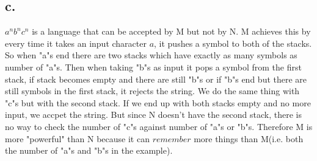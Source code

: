 \documentclass[12pt]{article}
\begin{document}
\subsection*{c.}
$a^nb^nc^n$ is a language that can be accepted by M but not by N. M achieves this by every time it takes an input character $a$, it pushes a symbol to both of the stacks. So when "a"s end there are two stacks which have exactly as many symbols as number of "a"s. Then when taking "b"s as input it pops a symbol from the first stack, if stack becomes empty and there are still "b"s or if "b"s end but there are still symbols in the first stack, it rejects the string. We do the same thing with "c"s but with the second stack. If we end up with both stacks empty and no more input, we accpet the string. But since N doesn't have the second stack, there is no way to check the number of "c"s against number of "a"s or "b"s. Therefore M is more "powerful" than N because it can $remember$ more things than M(i.e. both the number of "a"s and "b"s in the example).
\end{document}

